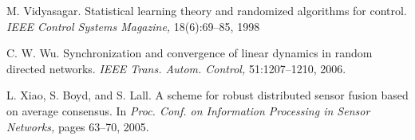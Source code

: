 \documentclass[12pt]{article} %
\begin{document}
\begin{thebibliography}{30}
		
		 M. Vidyasagar. Statistical learning theory and randomized algorithms for control. \textit{IEEE Control Systems Magazine,} 18(6):69–85, 1998
		
		
		 C. W. Wu. Synchronization and convergence of linear dynamics in random directed networks. \textit{IEEE Trans. Autom. Control,} 51:1207–1210, 2006.
		
		
		 L. Xiao, S. Boyd, and S. Lall. A scheme for robust distributed sensor fusion based on average consensus. In \textit{Proc. Conf. on Information Processing in Sensor Networks,} pages 63–70, 2005.
	\end{thebibliography}
\end{document}
